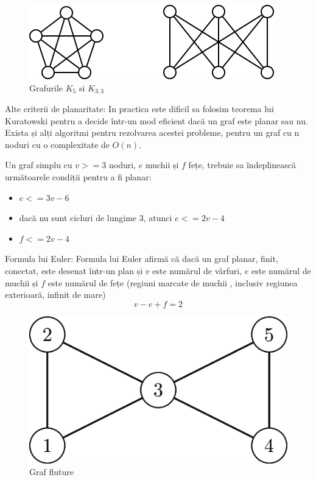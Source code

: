 \begin{figure}[H]
    \begin{center}
        \includegraphics[scale=0.7]{imagini/graf/notplanar.png}        
    \end{center}
    \caption{Grafurile \(K_5\) si \(K_{3,3}\) \protect\footnotemark}
    \label{fig:k5k33}
\end{figure}


Alte criterii de planaritate:\newline
In practica este dificil sa folosim teorema lui Kuratowski pentru a decide într-un mod eficient dacă un graf este planar sau nu. 
Exista și alți algoritmi pentru rezolvarea acestei probleme, pentru un graf cu n noduri cu o complexitate de \(O(n)\).

Un graf simplu  cu \(v>=3\) noduri, \(e\) muchii și \(f\) fețe, trebuie sa îndeplinească următoarele condiții pentru a fi planar:
\begin{itemize}
    \item  \(e<=3v-6\)
    \item  dacă nu sunt cicluri de lungime \(3\), atunci \(e<=2v-4\) 
    \item  \(f<=2v-4\)
\end{itemize}

Formula lui Euler: \newline
Formula lui Euler afirmă că dacă un graf planar, finit, conectat, este desenat într-un plan și \(v\) este numărul de vârfuri, 
\(e\) este numărul de muchii și \(f\) este numărul de fețe (regiuni marcate de muchii , inclusiv regiunea exterioară, infinit de mare)
\[v-e+f=2\]

\begin{figure}[H]
    \begin{center}
        \includegraphics[scale=0.5]{imagini/graf/butterfly.png}
        \caption{Graf fluture \protect\footnotemark}
        \label{fig:fluture}
    \end{center}    
\end{figure}

